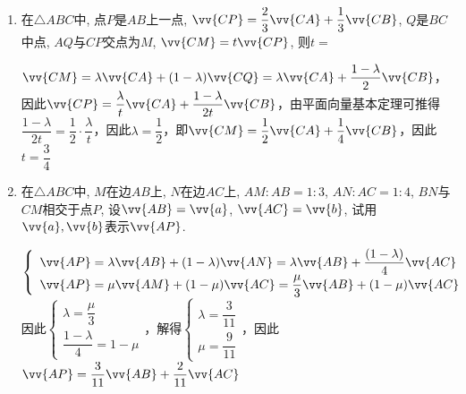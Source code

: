 \begin{enumerate}
    \item 在$\triangle{ABC}$中, 点$P$是$AB$上一点, $\vv{CP}=\dfrac{2}{3}\vv{CA}+\dfrac{1}{3}\vv{CB}$, $Q$是$BC$中点, $AQ$与$CP$交点为$M$, $\vv{CM}=t\vv{CP}$, 则$t=$
    \begin{jieda}
        $\vv{CM} = \lambda \vv{CA} + (1-\lambda) \vv{CQ} = \lambda \vv{CA} + \dfrac{1-\lambda}{2} \vv{CB}$，因此$\vv{CP} = \dfrac{\lambda}{t} \vv{CA} + \dfrac{1-\lambda}{2t} \vv{CB}$，由平面向量基本定理可推得$\dfrac{1-\lambda}{2t} = \dfrac{1}{2} \cdot \dfrac{\lambda}{t}$，因此$\lambda = \dfrac{1}{2}$，即$\vv{CM} = \dfrac{1}{2}\vv{CA} + \dfrac{1}{4}\vv{CB}$，因此$t = \dfrac{3}{4}$
    \end{jieda}

    
    \item 在$\triangle{ABC}$中, $M$在边$AB$上, $N$在边$AC$上, $AM:AB=1:3$, $AN:AC=1:4$, $BN$与$CM$相交于点$P$, 设$\vv{AB}=\vv{a}$, $\vv{AC}=\vv{b}$, 试用$\vv{a},\vv{b}$表示$\vv{AP}$. 
    \begin{jieda}
        $\left \{ \begin{array}{l}
             \vv{AP} = \lambda \vv{AB} + (1-\lambda) \vv{AN} =  \lambda \vv{AB} + \dfrac{(1-\lambda)}{4} \vv{AC} \\
             \vv{AP} = \mu \vv{AM} + (1-\mu) \vv{AC} =  \dfrac{\mu}{3} \vv{AB} + (1-\mu) \vv{AC}
        \end{array} \right. $
        因此$\left \{ \begin{array}{l}
             \lambda = \dfrac{\mu}{3} \\
             \dfrac{1-\lambda}{4} = 1-\mu
        \end{array} \right.$，解得$\left \{ \begin{array}{l}
             \lambda = \dfrac{3}{11} \\
             \mu = \dfrac{9}{11}
        \end{array} \right.$，因此$\vv{AP} = \dfrac{3}{11}\vv{AB} + \dfrac{2}{11} \vv{AC}$
    \end{jieda}
    

\end{enumerate}
